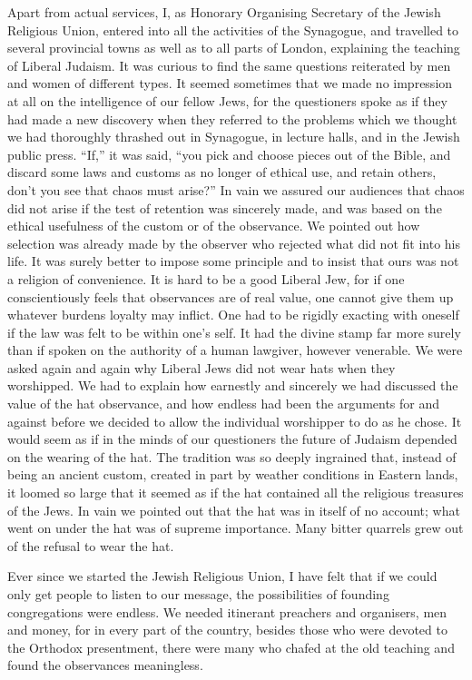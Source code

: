 Apart from actual services, I, as Honorary Organising
Secretary of the Jewish Religious Union, entered into
all the activities of the Synagogue, and travelled to
several provincial towns as well as to all parts of London,
explaining the teaching of Liberal Judaism. It was
curious to find the same questions reiterated by men and
women of different types. It seemed sometimes that we
made no impression at all on the intelligence of our
fellow Jews, for the questioners spoke as if they had
made a new discovery when they referred to the problems
which we thought we had thoroughly thrashed out in
Synagogue, in lecture halls, and in the Jewish public
press. “If,” it was said, “you pick and choose pieces
out of the Bible, and discard some laws and customs as
no longer of ethical use, and retain others, don’t you see
that chaos must arise?” In vain we assured our audiences
that chaos did not arise if the test of retention was
sincerely made, and was based on the ethical usefulness
of the custom or of the observance. We pointed out how
selection was already made by the observer who rejected
what did not fit into his life. It was surely better to
impose some principle and to insist that ours was not a
religion of convenience. It is hard to be a good Liberal
Jew, for if one conscientiously feels that observances are
of real value, one cannot give them up whatever burdens
loyalty may inflict. One had to be rigidly exacting with
oneself if the law was felt to be within one’s self. It had
the divine stamp far more surely than if spoken on the
authority of a human lawgiver, however venerable. We
were asked again and again why Liberal Jews did not
wear hats when they worshipped. We had to explain
how earnestly and sincerely we had discussed the value
of the hat observance, and how endless had been the
arguments for and against before we decided to allow
the individual worshipper to do as he chose. It would
seem as if in the minds of our questioners the future of
Judaism depended on the wearing of the hat. The
tradition was so deeply ingrained that, instead of being
an ancient custom, created in part by weather conditions
in Eastern lands, it loomed so large that it seemed as if
the hat contained all the religious treasures of the Jews.
In vain we pointed out that the hat was in itself of no
account; what went on under the hat was of supreme
importance. Many bitter quarrels grew out of the refusal
to wear the hat.

Ever since we started the Jewish Religious Union,
I have felt that if we could only get people to listen to
our message, the possibilities of founding congregations
were endless. We needed itinerant preachers and
organisers, men and money, for in every part of the
country, besides those who were devoted to the Orthodox
presentment, there were many who chafed at the old
teaching and found the observances meaningless.


